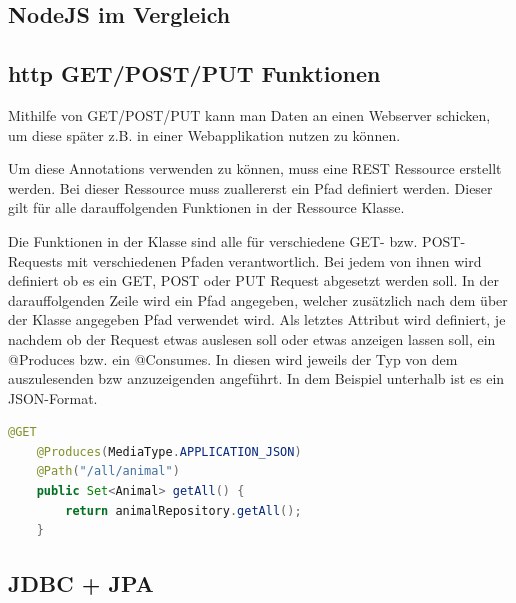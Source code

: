 \subsection{NodeJS im Vergleich}
\subsection{http GET/POST/PUT Funktionen}
Mithilfe von GET/POST/PUT kann man Daten an einen Webserver schicken, um diese später z.B. in einer Webapplikation nutzen zu können.

Um diese Annotations verwenden zu können, muss eine REST Ressource erstellt werden.
Bei dieser Ressource muss zuallererst ein Pfad definiert werden. Dieser gilt für alle darauffolgenden Funktionen in der Ressource Klasse.

Die Funktionen in der Klasse sind alle für verschiedene GET- bzw. POST-Requests mit verschiedenen Pfaden verantwortlich. Bei jedem von ihnen wird definiert ob es ein GET, POST oder PUT Request abgesetzt werden soll. In der darauffolgenden Zeile wird ein Pfad angegeben, welcher zusätzlich nach dem über der Klasse angegeben Pfad verwendet wird. Als letztes Attribut wird definiert, je nachdem ob der Request etwas auslesen soll oder etwas anzeigen lassen soll, ein @Produces bzw. ein @Consumes. In diesen wird jeweils der Typ von dem auszulesenden bzw anzuzeigenden angeführt. In dem Beispiel unterhalb ist es ein JSON-Format.

\begin{lstlisting}[language=java,caption=Quarkus POST-Request,label=lst:impl:canvasJSchartOptions]
    @GET
    @Produces(MediaType.APPLICATION_JSON)
    @Path("/all/animal")
    public Set<Animal> getAll() {
        return animalRepository.getAll();
    }
  \end{lstlisting}

\subsection{JDBC + JPA}